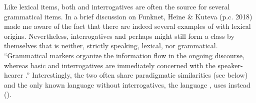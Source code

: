 \noindent Like lexical items, both  and interrogatives are often the source for several grammatical items. In a brief discussion on Funknet, Heine \& Kuteva (p.c. 2018) made me aware of the fact that there are indeed several examples of  with lexical origins. Nevertheless, interrogatives and perhaps  might still form a class by themselves that is neither, strictly speaking, lexical, nor grammatical. “Grammatical markers organize the information flow in the ongoing discourse, whereas basic  and interrogatives are immediately concerned with the speaker-hearer .” \citep[635]{Diessel2003} Interestingly, the two often share paradigmatic similarities (see below) and the only known language without interrogatives, the  language , uses  instead (\citealt{EverettKern1997}).

